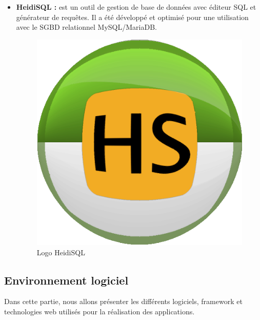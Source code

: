 \begin{itemize}
	\item \textbf{HeidiSQL\cite{heidisql} :} est un outil de gestion de base de données avec éditeur SQL et générateur de requêtes.  Il a été développé et optimisé pour une utilisation avec le SGBD relationnel MySQL/MariaDB.
	\begin{figure}[H]
		\centering
		\includegraphics[width=0.08\linewidth]{img/logos/HeidiSQL}
		\caption[Logo HeidiSQL]{Logo HeidiSQL}
		\label{fig:heidisql}
	\end{figure}
\end{itemize}

\subsection[Environnement logiciel]{Environnement logiciel}
Dans cette partie, nous allons présenter les différents logiciels, framework et technologies web utilisés pour la réalisation des applications.
